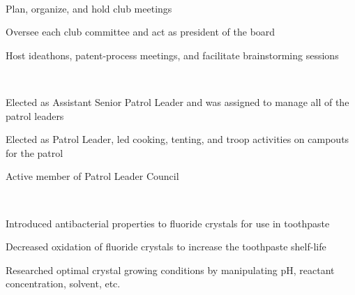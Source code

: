 \documentclass[a4paper]{MagicalCV}
\begin{document}
\begin{flushleft}
 \\
\vspace{\topsep} %
\begin{tightemize}
\item Plan, organize, and hold club meetings
\item Oversee each club committee and act as president of the board
\item Host ideathons, patent-process meetings, and facilitate brainstorming sessions
\end{tightemize}
\sectionsep 

 \\
\vspace{\topsep} %
\begin{tightemize}
\item Elected as Assistant Senior Patrol Leader and was assigned to manage all of the patrol leaders
\item Elected as Patrol Leader, led cooking, tenting, and troop activities on campouts for the patrol
\item Active member of Patrol Leader Council
\end{tightemize}
\sectionsep

 \\
\vspace{\topsep} %
\begin{tightemize}
\item Introduced antibacterial properties to fluoride crystals for use in toothpaste
\item Decreased oxidation of fluoride crystals to increase the toothpaste shelf-life
\item Researched optimal crystal growing conditions by manipulating pH, reactant concentration, solvent, etc.
\end{tightemize}
\sectionsep 


\end{flushleft}
\end{document}
